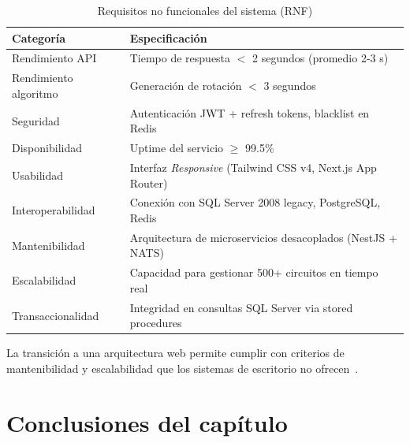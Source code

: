 \begin{table}[H]
\centering
\caption{Requisitos no funcionales del sistema (RNF)}
\label{tab:requisitos_no_funcionales}
\begin{tabular}{|l|l|}
\hline
\textbf{Categoría} & \textbf{Especificación} \\ \hline
Rendimiento API & Tiempo de respuesta $<$ 2 segundos (promedio 2-3 s) \\ \hline
Rendimiento algoritmo & Generación de rotación $<$ 3 segundos \\ \hline
Seguridad & Autenticación JWT + refresh tokens, blacklist en Redis \\ \hline
Disponibilidad & Uptime del servicio $\geq$ 99.5\% \\ \hline
Usabilidad & Interfaz \textit{Responsive} (Tailwind CSS v4, Next.js App Router) \\ \hline
Interoperabilidad & Conexión con SQL Server 2008 legacy, PostgreSQL, Redis \\ \hline
Mantenibilidad & Arquitectura de microservicios desacoplados (NestJS + NATS) \\ \hline
Escalabilidad & Capacidad para gestionar 500+ circuitos en tiempo real \\ \hline
Transaccionalidad & Integridad en consultas SQL Server via stored procedures \\ \hline
\hline
\end{tabular}
\end{table}

La transición a una arquitectura web permite cumplir con criterios de mantenibilidad y escalabilidad que los sistemas de escritorio no ofrecen~\citep{cujae2021}.

\section{Conclusiones del capítulo}

